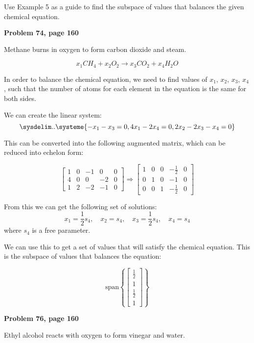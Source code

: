 \documentclass[12pt]{article}
\begin{document}
Use Example 5 as a guide to find the subspace of values that balances the given chemical equation.

\textbf{Problem 74, page 160}

Methane burns in oxygen to form carbon dioxide and steam.

$$x_1CH_4 + x_2O_2 \rightarrow x_3CO_2 + x_4H_2O$$

\begin{solution}
In order to balance the chemical equation, we need to find values of $x_1$, $x_2$, $x_3$, $x_4$, such that the number of atoms for each element in the equation is the same for both sides.

We can create the linear system:
$$\sysdelim..\systeme{
  -x_1 -        x_3                   = 0,
  4x_1                        -2x_4   = 0,
         2x_2 - 2x_3           -x_4   = 0
}$$

This can be converted into the following augmented matrix, which can be reduced into echelon form:

$$\begin{bmatrix} 1 & 0 & -1 & 0 & 0 \\
				   4 & 0 & 0 & -2 & 0 \\
				   1 & 2 & -2 & -1 & 0 \end{bmatrix} \Rightarrow 
\begin{bmatrix} 1 & 0 & 0 & -\frac{1}{2} & 0 \\
				 0 & 1 & 0 & -1 & 0 \\
				 0 & 0 & 1 & -\frac{1}{2} & 0 \end{bmatrix} $$
				 
From this we can get the following set of solutions:
$$ x_1 = \frac{1}{2}s_4, \quad x_2 = s_4, \quad x_3 = \frac{1}{2}s_4,\quad  x_4 = s_4$$ where $s_4$ is a free parameter.

We can use this to get a set of values that will satisfy the chemical equation. This is the subspace of values that balances the equation:

$$\text{span}\left\lbrace \begin{bmatrix} \frac{1}{2} \\ 1 \\ \frac{1}{2} \\ 1 \end{bmatrix} \right\rbrace $$


\end{solution}

\pagebreak
\textbf{Problem 76, page 160}

Ethyl alcohol reacts with oxygen to form vinegar and water.
\end{document}
